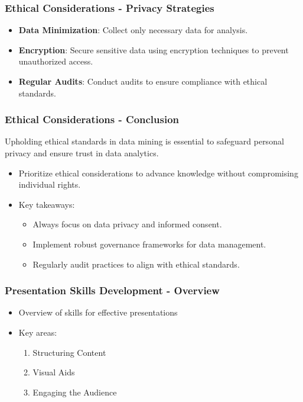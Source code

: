 \documentclass[aspectratio=169]{beamer}
\begin{document}
\begin{frame}[fragile]
    \frametitle{Ethical Considerations - Privacy Strategies}
    \begin{itemize}
        \item \textbf{Data Minimization}: Collect only necessary data for analysis.
        \item \textbf{Encryption}: Secure sensitive data using encryption techniques to prevent unauthorized access.
        \item \textbf{Regular Audits}: Conduct audits to ensure compliance with ethical standards.
    \end{itemize}
\end{frame}

\begin{frame}[fragile]
    \frametitle{Ethical Considerations - Conclusion}
    Upholding ethical standards in data mining is essential to safeguard personal privacy and ensure trust in data analytics. 
    \begin{itemize}
        \item Prioritize ethical considerations to advance knowledge without compromising individual rights.
        \item Key takeaways:
        \begin{itemize}
            \item Always focus on data privacy and informed consent.
            \item Implement robust governance frameworks for data management.
            \item Regularly audit practices to align with ethical standards.
        \end{itemize}
    \end{itemize}
\end{frame}

\begin{frame}[fragile]
    \frametitle{Presentation Skills Development - Overview}
    \begin{itemize}
        \item Overview of skills for effective presentations
        \item Key areas:
        \begin{enumerate}
            \item Structuring Content
            \item Visual Aids
            \item Engaging the Audience
        \end{enumerate}
    \end{itemize}
\end{frame}
\end{document}
